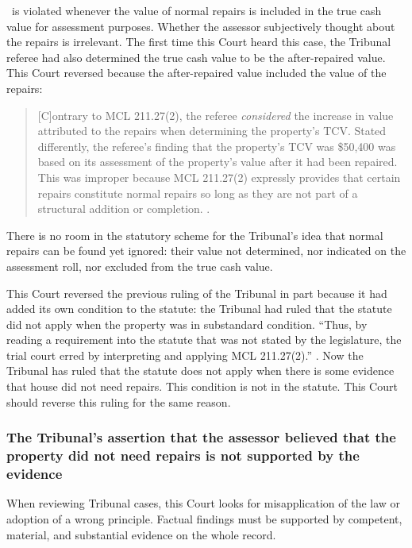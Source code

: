 \documentclass[12pt,\documentclassflag]{michiganCourtOfAppealsBrief}
\begin{document}
\mathieuGast\ is violated whenever the value of normal repairs is included in the true cash value for assessment purposes. Whether the assessor subjectively thought about the repairs is irrelevant. The first time this Court heard this case, the Tribunal referee had also determined the true cash value to be the after-repaired value. This Court reversed because the after-repaired value included the value of the repairs:

\begin{quote}
[C]ontrary to MCL 211.27(2), the referee {\em considered} the increase in value attributed to the repairs when determining the property's TCV. Stated differently, the referee's finding that the property's TCV was \$50,400 was based on its assessment of the property's value after it had been repaired. This was improper because MCL 211.27(2) expressly provides that certain repairs constitute normal repairs so long as they are not part of a structural addition or completion. .
\end{quote}

There is no room in the statutory scheme for the Tribunal's idea that normal repairs can be found yet ignored: their value not determined, nor indicated on the assessment roll, nor excluded from the true cash value.

This Court reversed the previous ruling of the Tribunal in part because it had added its own condition to the statute: the Tribunal had ruled that the statute did not apply when the property was in substandard condition. ``Thus, by reading a requirement into the statute that was not stated by the legislature, the trial court erred by interpreting and applying MCL 211.27(2).'' . Now the Tribunal has ruled that the statute does not apply when there is some evidence that house did not need repairs. This condition is not in the statute. This Court should reverse this ruling for the same reason.

\subsubsection{The Tribunal's assertion that the assessor believed that the property did not need repairs is not supported by the evidence}
When reviewing Tribunal cases, this Court looks for misapplication of the law or adoption of a wrong principle. Factual findings must be supported by competent, material, and substantial evidence on the whole record. 
\end{document}
